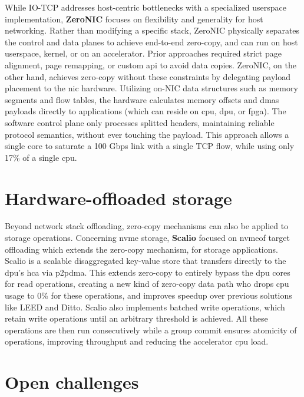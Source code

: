 While IO-TCP addresses host-centric bottlenecks with a specialized userspace implementation, \textbf{ZeroNIC} \cite{skiadopoulos_high-throughput_2024} focuses on flexibility and generality for host networking. Rather than modifying a specific stack, ZeroNIC physically separates the control and data planes to achieve end-to-end zero-copy, and can run on host userspace, kernel, or on an accelerator. Prior approaches required strict page alignment, page remapping, or custom \acrfull{api} to avoid data copies. ZeroNIC, on the other hand, achieves zero-copy without these constraints by delegating payload placement to the \acrshort{nic} hardware. Utilizing on-NIC data structures such as memory segments and flow tables, the hardware calculates memory offsets and \acrshort{dma}s payloads directly to applications (which can reside on \acrshort{cpu}, \acrshort{dpu}, or \acrshort{fpga}). The software control plane only processes splitted headers, maintaining reliable protocol semantics, without ever touching the payload. This approach allows a single core to saturate a 100 Gbps link with a single TCP flow, while using only 17\% of a single \acrshort{cpu}.

\section{Hardware-offloaded storage}

Beyond network stack offloading, zero-copy mechanisms can also be applied to storage operations. Concerning \acrshort{nvme} storage, \textbf{Scalio} \cite{sun_scalio_2025} focused on \acrshort{nvmeof} target offloading which extends the zero-copy mechanism, for storage applications. Scalio is a scalable disaggregated key-value store that transfers directly to the \acrfull{dpu}'s \acrfull{hca} via \acrshort{p2pdma}. This extends zero-copy to entirely bypass the \acrshort{dpu} cores for read operations, creating a new kind of zero-copy data path who drops \acrshort{cpu} usage to 0\% for these operations, and improves speedup over previous solutions like LEED\cite{guo_leed_2023} and Ditto\cite{shen_ditto_2023}. Scalio also implements batched write operations, which retain write operations until an arbitrary threshold is achieved. All these operations are then run consecutively while a group commit ensures atomicity of operations, improving throughput and reducing the accelerator \acrshort{cpu} load.


\section{Open challenges}

